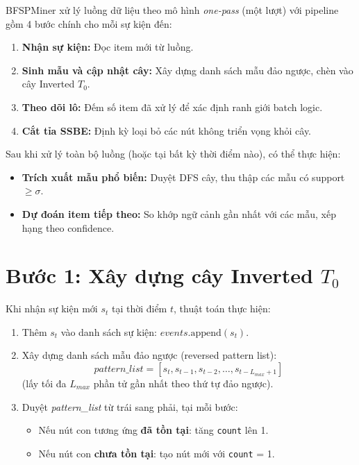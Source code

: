 \documentclass[14pt,a4paper,oneside]{extreport}
\begin{document}
BFSPMiner xử lý luồng dữ liệu theo mô hình \textit{one-pass} (một lượt) với pipeline gồm 4 bước chính cho mỗi sự kiện đến:

\begin{enumerate}
    \item \textbf{Nhận sự kiện:} Đọc item mới từ luồng.
    \item \textbf{Sinh mẫu và cập nhật cây:} Xây dựng danh sách mẫu đảo ngược, chèn vào cây Inverted $T_0$.
    \item \textbf{Theo dõi lô:} Đếm số item đã xử lý để xác định ranh giới batch logic.
    \item \textbf{Cắt tỉa SSBE:} Định kỳ loại bỏ các nút không triển vọng khỏi cây.
\end{enumerate}

Sau khi xử lý toàn bộ luồng (hoặc tại bất kỳ thời điểm nào), có thể thực hiện:
\begin{itemize}
    \item \textbf{Trích xuất mẫu phổ biến:} Duyệt DFS cây, thu thập các mẫu có support $\geq \sigma$.
    \item \textbf{Dự đoán item tiếp theo:} So khớp ngữ cảnh gần nhất với các mẫu, xếp hạng theo confidence.
\end{itemize}

\section{Bước 1: Xây dựng cây Inverted $T_0$}
\label{sec:build_tree}

Khi nhận sự kiện mới $s_t$ tại thời điểm $t$, thuật toán thực hiện:

\begin{enumerate}
    \item Thêm $s_t$ vào danh sách sự kiện: $\textit{events}.\text{append}(s_t)$.
    \item Xây dựng danh sách mẫu đảo ngược (reversed pattern list):
    \begin{equation}
        \textit{pattern\_list} = [s_t, s_{t-1}, s_{t-2}, \dots, s_{t-L_{max}+1}]
    \end{equation}
    (lấy tối đa $L_{max}$ phần tử gần nhất theo thứ tự đảo ngược).
    \item Duyệt \textit{pattern\_list} từ trái sang phải, tại mỗi bước:
    \begin{itemize}
        \item Nếu nút con tương ứng \textbf{đã tồn tại}: tăng \texttt{count} lên 1.
        \item Nếu nút con \textbf{chưa tồn tại}: tạo nút mới với \texttt{count} = 1.
    \end{itemize}
\end{enumerate}
\end{document}

